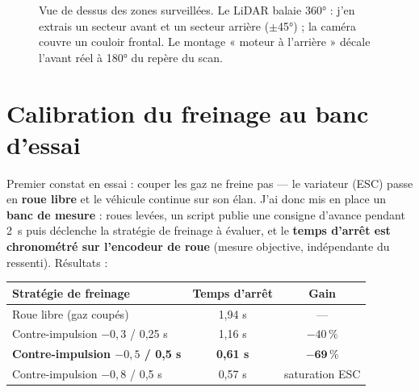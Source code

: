 \documentclass[11pt,a4paper]{article}
\begin{document}
\begin{figure}[h]
\centering
{}
\caption{Vue de dessus des zones surveillées. Le LiDAR balaie 360° : j'en extrais un
secteur avant et un secteur arrière ($\pm$45°) ; la caméra couvre un couloir frontal.
Le montage « moteur à l'arrière » décale l'avant réel à 180° du repère du scan.}
\label{fig:secteurs}
\end{figure}

\section{Calibration du freinage au banc d'essai}
Premier constat en essai : couper les gaz ne freine pas — le variateur (ESC) passe
en \textbf{roue libre} et le véhicule continue sur son élan. J'ai donc mis en place un
\textbf{banc de mesure} : roues levées, un script publie une consigne d'avance
pendant 2~s puis déclenche la stratégie de freinage à évaluer, et le \textbf{temps
d'arrêt est chronométré sur l'encodeur de roue} (mesure objective, indépendante du
ressenti). Résultats :

\begin{center}
\renewcommand{\arraystretch}{1.2}
\begin{tabular}{@{}lcc@{}}
\toprule
\textbf{Stratégie de freinage} & \textbf{Temps d'arrêt} & \textbf{Gain} \\
\midrule
Roue libre (gaz coupés)              & 1,94 s & --- \\
Contre-impulsion $-0{,}3$ / 0,25 s   & 1,16 s & $-40\,\%$ \\
\textbf{Contre-impulsion $-0{,}5$ / 0,5 s} & \textbf{0,61 s} & $\mathbf{-69\,\%}$ \\
Contre-impulsion $-0{,}8$ / 0,5 s    & 0,57 s & saturation ESC \\
\bottomrule
\end{tabular}
\end{center}
\end{document}
